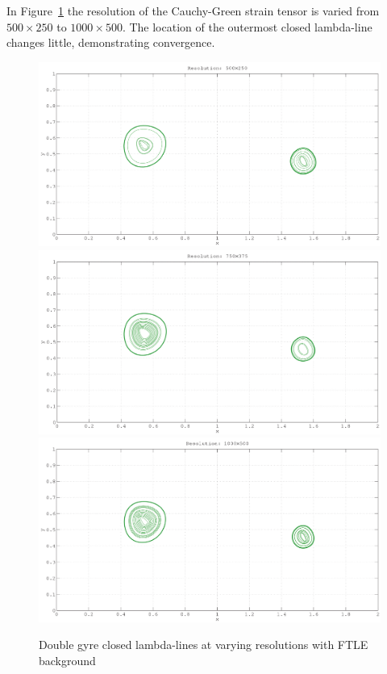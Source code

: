 \documentclass{article}
\begin{document}


In Figure~\ref{fig:double_gyre_lambda_lcs_convergence} the resolution of the  Cauchy-Green strain tensor is varied from $500 \times 250$ to $1000 \times 500$. The location of the outermost closed lambda-line changes little, demonstrating convergence.

\begin{figure}[hbt]
  \centering
  \includegraphics[width=.8\textwidth]{graphics/double_gyre/lambda_lcs_convergence_500}
\includegraphics[width=.8\textwidth]{graphics/double_gyre/lambda_lcs_convergence_750}
\includegraphics[width=.8\textwidth]{graphics/double_gyre/lambda_lcs_convergence_1000}
  \caption{Double gyre closed lambda-lines at varying resolutions with FTLE background}
  \label{fig:double_gyre_lambda_lcs_convergence}
\end{figure}
\end{document}
